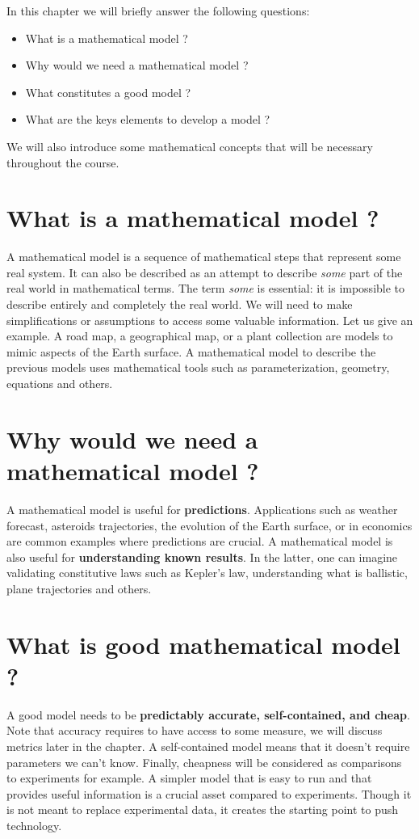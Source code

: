 \minitoc

In this chapter we will briefly answer the following questions:
\begin{itemize}
\item What is a mathematical model ?
\item Why would we need a mathematical model ?
\item What constitutes a good model ?
\item What are the keys elements to develop a model ? 
\end{itemize}
We will also introduce some mathematical concepts that will be necessary throughout the course.\\
\section{What is a mathematical model ? }
A mathematical model is a sequence of mathematical steps that represent some real system. It can also be described as an attempt to describe \textit{some} part of the real world in mathematical terms. The term \textit{some} is essential: it is impossible to describe entirely and completely the real world. We will need to make simplifications or assumptions to access some valuable information. Let us give an example. A road map, a geographical map, or a plant collection are models to mimic aspects of the Earth surface. A mathematical model to describe the previous models uses mathematical tools such as parameterization, geometry, equations and others.

\section{Why would we need a mathematical model ? }
A mathematical model is useful for \textbf{predictions}. Applications such as weather forecast, asteroids trajectories, the evolution of the Earth surface, or in economics are common examples where predictions are crucial. A mathematical model is also useful for \textbf{understanding known results}. In the latter, one can imagine validating constitutive laws such as Kepler's law, understanding what is ballistic, plane trajectories and others.

\section{What is good mathematical model ? }
A good model needs to be \textbf{predictably accurate, self-contained, and cheap}. Note that accuracy requires to have access to some measure, we will discuss metrics later in the chapter. A self-contained model means that it doesn't require parameters we can't know. Finally, cheapness will be considered as comparisons to experiments for example. A simpler model that is easy to run and that provides useful information is a crucial asset compared to experiments. Though it is not meant to replace experimental data, it creates the starting point to push technology.\\

